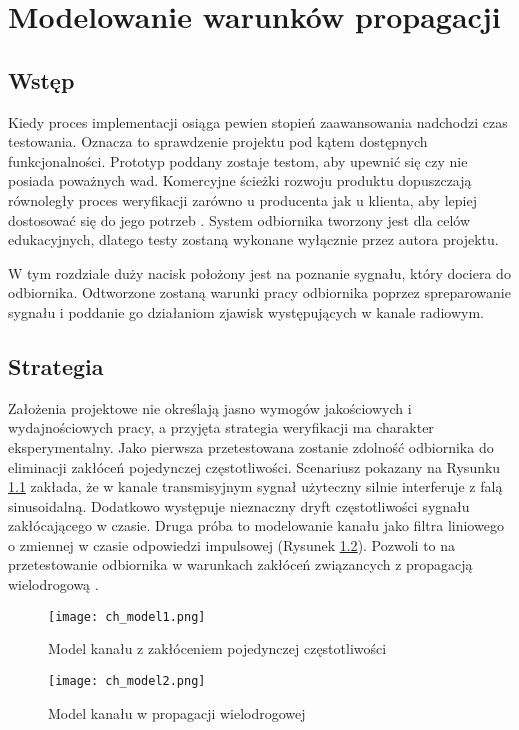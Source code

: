 \chapter{Modelowanie warunków propagacji}
\section{Wstęp}
Kiedy proces implementacji osiąga pewien stopień zaawansowania nadchodzi czas testowania. 
Oznacza to sprawdzenie projektu pod kątem dostępnych funkcjonalności. 
Prototyp poddany zostaje testom, aby upewnić się czy nie posiada poważnych wad. 
Komercyjne ścieżki rozwoju produktu dopuszczają równoległy proces weryfikacji zarówno u producenta jak u klienta, aby lepiej dostosować się do jego potrzeb \cite{product_dev}. 
System odbiornika tworzony jest dla celów edukacyjnych, dlatego testy zostaną wykonane wyłącznie przez autora projektu. 

W tym rozdziale duży nacisk położony jest na poznanie sygnału, który dociera do odbiornika. 
Odtworzone zostaną warunki pracy odbiornika poprzez spreparowanie sygnału i poddanie go działaniom zjawisk występujących w kanale radiowym. 
\section{Strategia}
Założenia projektowe nie określają jasno wymogów jakościowych i wydajnościowych pracy, a przyjęta strategia weryfikacji ma charakter eksperymentalny. 
Jako pierwsza przetestowana zostanie zdolność odbiornika do eliminacji zakłóceń pojedynczej częstotliwości. 
Scenariusz pokazany na Rysunku \ref{cwmodel} zakłada, że w kanale transmisyjnym sygnał użyteczny silnie interferuje z falą sinusoidalną. 
Dodatkowo występuje nieznaczny dryft częstotliwości sygnału zakłócającego w czasie.
Druga próba to modelowanie kanału jako filtra liniowego o zmiennej w czasie odpowiedzi impulsowej (Rysunek \ref{mpathmodel}). 
Pozwoli to na przetestowanie odbiornika w warunkach zakłóceń związancych z propagacją wielodrogową \cite{indoor_ch_model}.

\begin{figure}[ht]
\centering
\texttt{[image: ch\_model1.png]}
\caption{Model kanału z zakłóceniem pojedynczej częstotliwości}
\label{cwmodel}
\end{figure}

\begin{figure}[ht]
\centering
\texttt{[image: ch\_model2.png]}
\caption{Model kanału w propagacji wielodrogowej}
\label{mpathmodel}
\end{figure}
